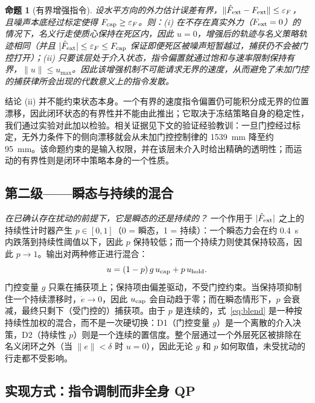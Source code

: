 \documentclass[journal]{IEEEtran}
\newtheorem{proposition}{命题}
\begin{document}
\begin{proposition}[有界增强指令]
\label{prop:bounded}
设水平方向的外力估计误差有界，$\|\hat F_{\rm ext}-F_{\rm ext}\|\le\varepsilon_F$，且噪声本底经过标定使得 $F_{\rm cap}\ge\varepsilon_F$。则：(i) 在不存在真实外力（$F_{\rm ext}=0$）的情况下，名义行走使质心保持在死区内，因此 $u=0$，增强后的轨迹与名义策略轨迹相同（并且 $|\hat F_{\rm ext}|\le\varepsilon_F\le F_{\rm cap}$ 保证即便死区被噪声短暂越过，捕获仍不会被门控打开）；(ii) 只要该层处于介入状态，指令偏置就通过饱和与速率限制保持有界，$\|u\|\le u_{\max}$。因此该增强机制不可能请求无界的速度，从而避免了未加门控的捕获律所会出现的\emph{代数意义上的}指令发散。
\end{proposition}

结论 (ii) 并不能约束状态本身。一个有界的速度指令偏置仍可能积分成无界的位置漂移，因此闭环状态的有界性并不能由此推出；它取决于冻结策略自身的稳定性，我们通过实验对此加以检验。相关证据见下文的验证经验教训：一旦门控经过标定，无外力条件下的侧向漂移就会从未加门控控制律的 1539~mm 降至约 95~mm。该命题约束的是输入权限，并在该层未介入时给出精确的透明性；而运动的有界性则是闭环中策略本身的一个性质。

\subsection{第二级——瞬态与持续的混合}
\label{sec:blend}

\emph{在已确认存在扰动的前提下，它是瞬态的还是持续的？} 一个作用于 $|\hat F_{\rm ext}|$ 之上的持续性计时器产生 $p\in[0,1]$（0 = 瞬态，1 = 持续）：一个瞬态力会在约 0.4~s 内跌落到持续性阈值以下，因此 $p$ 保持较低；而一个持续力则使其保持较高，因此 $p\to 1$。输出对两种修正进行混合：
\begin{equation}
u=(1-p)\,g\,u_{\rm cap}+p\,u_{\rm hold}.
\label{eq:blend}
\end{equation}
门控变量 $g$ 只乘在捕获项上；保持项由偏差驱动，不受门控约束。当保持项抑制住一个持续漂移时，$\dot e\to 0$，因此 $u_{\rm cap}$ 会自动趋于零；而在瞬态情形下，$p$ 会衰减，最终只剩下（受门控的）捕获项。由于 $p$ 是连续的，式~\eqref{eq:blend} 是一种按持续性加权的混合，而不是一次硬切换：D1（门控变量 $g$）是一个离散的介入决策，D2（持续性 $p$）则是一个连续的置信度。整个层通过一个外层死区被排除在名义闭环之外（当 $\|e\|<\delta$ 时 $u=0$），因此无论 $g$ 和 $p$ 如何取值，未受扰动的行走都不受影响。

\subsection{实现方式：指令调制而非全身 QP}
\label{sec:realize}
\end{document}
